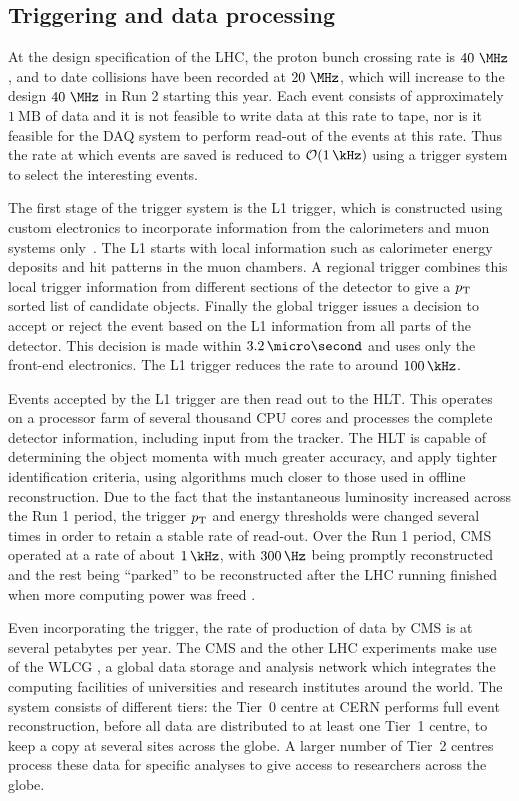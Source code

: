 \subsection{Triggering and data processing}
\label{sec:trigger}

At the design specification of the LHC, the proton bunch crossing rate is
$40~\MHz$, and to date collisions have been recorded at $20~\MHz$, which will
increase to the design $40~\MHz$ in Run 2 starting this year. Each event
consists of approximately $1~\text{MB}$ of data and it is not feasible to write
data at this rate to tape, nor is it feasible for the \ac{DAQ} system to perform
read-out of the events at this rate. Thus the rate at which events are saved is
reduced to $\mathcal{O}(1\,\kHz)$ using a trigger system to select the
interesting events.

The first stage of the trigger system is the \ac{L1} trigger, which is
constructed using custom electronics to incorporate information from the
calorimeters and muon systems only~\cite{Chatrchyan:2008aa}. The \ac{L1} starts with local information
such as calorimeter energy deposits and hit patterns in the muon chambers. A
regional trigger combines this local trigger information from different sections
of the detector to give a $p_{\mathrm{T}}$ sorted list of candidate objects. Finally the
global trigger issues a decision to accept or reject the event based on the
\ac{L1} information from all parts of the detector. This decision is made within
$3.2\,\micro\second$ and uses only the front-end electronics. The \ac{L1}
trigger reduces the rate to around $100\,\kHz$.  

Events accepted by the \ac{L1} trigger are then read out to the \ac{HLT}. This
operates on a processor farm of several thousand CPU cores and processes the 
complete detector information, including input from the tracker. The \ac{HLT}
is capable of determining the object momenta with much greater accuracy, and
apply tighter identification criteria, using algorithms much closer to those
used in offline reconstruction. Due to the fact that the instantaneous luminosity
increased across the Run 1 period, the trigger $p_{\mathrm{T}}$ and energy thresholds were
changed several times in order to retain a stable rate of read-out. Over the Run
1 period, CMS operated at a rate of about $1\,\kHz$, with $300\,\Hz$ being promptly
reconstructed and the rest being ``parked'' to be reconstructed after the LHC running
finished when more computing power was freed \cite{CMS:2012ooa}.

Even incorporating the trigger, the rate of production of data by CMS is at
several petabytes per year. The CMS and the other LHC experiments make use of
the \ac{WLCG} \cite{web:grid}, a global data storage and analysis network which
integrates the computing facilities of universities and research institutes
around the world. The system consists of different tiers: the Tier~0 centre at
CERN performs full event reconstruction, before all data are distributed to at
least one Tier~1 centre, to keep a copy at several sites across the globe. A
larger number of Tier~2 centres process these data for specific analyses to give
access to researchers across the globe. 
